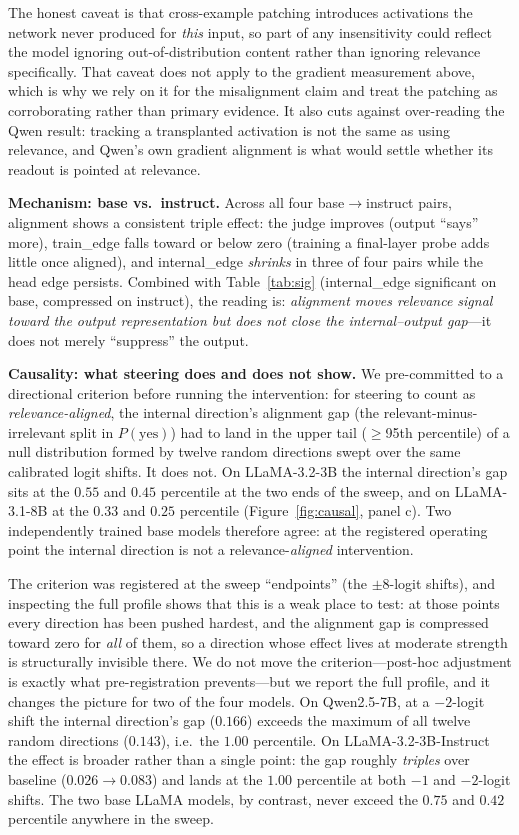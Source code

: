 \documentclass[11pt]{article}
\begin{document}
The honest caveat is that cross-example patching introduces activations the
network never produced for \emph{this} input, so part of any insensitivity could
reflect the model ignoring out-of-distribution content rather than ignoring
relevance specifically. That caveat does not apply to the gradient measurement
above, which is why we rely on it for the misalignment claim and treat the
patching as corroborating rather than primary evidence. It also cuts against
over-reading the Qwen result: tracking a transplanted activation is not the same
as using relevance, and Qwen's own gradient alignment is what would settle
whether its readout is pointed at relevance.

\textbf{Mechanism: base vs.\ instruct.}\label{sec:mech} Across all four base$\to$instruct pairs,
alignment shows a consistent triple effect: the judge improves (output
``says'' more), train\_edge falls toward or below zero (training a final-layer
probe adds little once aligned), and internal\_edge \emph{shrinks} in three of
four pairs while the head edge persists. Combined with
Table~\ref{tab:sig} (internal\_edge significant on base, compressed on
instruct), the reading is: \emph{alignment moves relevance signal toward the
output representation but does not close the internal--output gap}---it does
not merely ``suppress'' the output.

\textbf{Causality: what steering does and does not show.}
We pre-committed to a directional criterion before running the intervention: for
steering to count as \emph{relevance-aligned}, the internal direction's
alignment gap (the relevant-minus-irrelevant split in $P(\text{yes})$) had to
land in the upper tail ($\ge$95th percentile) of a null distribution formed by
twelve random directions swept over the same calibrated logit shifts. It does not. On LLaMA-3.2-3B the internal direction's gap sits at the $0.55$ and
$0.45$ percentile at the two ends of the sweep, and on LLaMA-3.1-8B at the
$0.33$ and $0.25$ percentile (Figure~\ref{fig:causal}, panel c). Two
independently trained base models therefore agree: at the registered operating
point the internal direction is not a relevance-\emph{aligned} intervention.

The criterion was registered at the sweep ``endpoints'' (the $\pm8$-logit
shifts), and inspecting the full profile shows that this is a weak place to
test: at those points every direction has been pushed hardest, and the
alignment gap is compressed toward zero for \emph{all} of them, so a direction
whose effect lives at moderate strength is structurally invisible there. We do
not move the criterion---post-hoc adjustment is exactly what pre-registration
prevents---but we report the full profile, and it changes the picture for two
of the four models. On Qwen2.5-7B, at a $-2$-logit shift the internal
direction's gap ($0.166$) exceeds the maximum of all twelve random directions
($0.143$), i.e.\ the $1.00$ percentile. On LLaMA-3.2-3B-Instruct the effect is
broader rather than a single point: the gap roughly \emph{triples} over baseline
($0.026 \to 0.083$) and lands at the $1.00$ percentile at both $-1$ and
$-2$-logit shifts. The two base LLaMA models, by contrast, never exceed the
$0.75$ and $0.42$ percentile anywhere in the sweep.
\end{document}
